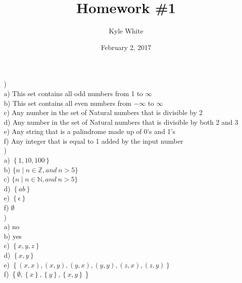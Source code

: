 \documentclass{article}
\title{Homework \#1}
\author{Kyle White}
\date{February 2, 2017}
\begin{document}
\maketitle

)\\
a) This set contains all odd numbers from 1 to $\infty$\\
b) This set contains all even numbers from $-\infty$ to $\infty$\\
c) Any number in the set of Natural numbers that is divisible by 2\\
d) Any number in the set of Natural numbers that is divisible by both 2 and 3\\
e) Any string that is a palindrome made up of 0's and 1's\\
f) Any integer that is equal to 1 added by the input number\\

)\\
a) $\left\{1, 10, 100\right\}$\\
b) $\{n \mid n \in \mathbb{Z}, and \ n > 5\}$\\
c) $\{n \mid n \in \mathbb{N}, and \ n > 5\}$\\
d) $\left\{ab\right\}$\\
e) $\left\{ \epsilon \right\}$\\
f) $\emptyset$ \\

)\\
a) no\\
b) yes\\
c) $\left\{x,y,z\right\}$\\
d) $\left\{x,y\right\}$\\
e) $\left\{(x,x), (x,y), (y,x), (y,y), (z,x), (z,y)\right\}$\\
f) $\left\{\emptyset, \left\{x\right\}, \left\{y\right\}, \left\{x,y\right\}\right\}$\\
\end{document}
